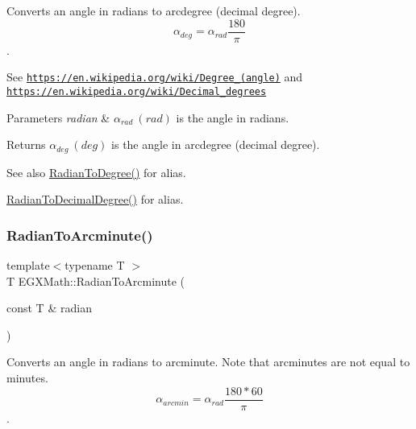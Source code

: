 Converts an angle in radians to arcdegree (decimal degree). \[\alpha_{deg}=\alpha_{rad}\frac{180}{\pi}\]. 

See \href{https://en.wikipedia.org/wiki/Degree_(angle)}{\tt https\+://en.\+wikipedia.\+org/wiki/\+Degree\+\_\+(angle)} and \href{https://en.wikipedia.org/wiki/Decimal_degrees}{\tt https\+://en.\+wikipedia.\+org/wiki/\+Decimal\+\_\+degrees} 
\begin{DoxyParams}{Parameters}
{\em radian} & $\alpha_{rad}\ (rad)$ is the angle in radians. \\
\hline
\end{DoxyParams}
\begin{DoxyReturn}{Returns}
$\alpha_{deg}\ (deg)$ is the angle in arcdegree (decimal degree). 
\end{DoxyReturn}
\begin{DoxySeeAlso}{See also}
\mbox{\hyperlink{group___e_g_x_math-_angle_conversions-_radian_ga25bbce6cdc1c3621f2a158d320e3bc45}{Radian\+To\+Degree()}} for alias. 

\mbox{\hyperlink{group___e_g_x_math-_angle_conversions-_radian_ga6d170f1882c32de53167c04524d05f67}{Radian\+To\+Decimal\+Degree()}} for alias. 
\end{DoxySeeAlso}
\mbox{\label{group___e_g_x_math-_angle_conversions-_radian_ga722e3b8e78540a6b3942b73b64aeb8d2}} 
\subsubsection{\texorpdfstring{Radian\+To\+Arcminute()}{RadianToArcminute()}}
{\footnotesize\ttfamily template$<$typename T $>$ \\
T E\+G\+X\+Math\+::\+Radian\+To\+Arcminute (\begin{DoxyParamCaption}\item[{const T \&}]{radian }\end{DoxyParamCaption})}



Converts an angle in radians to arcminute. Note that arcminutes are not equal to minutes. \[\alpha_{arcmin}=\alpha_{rad}\frac{180 * 60}{\pi}\]. 

